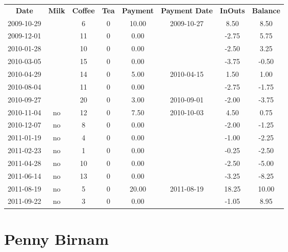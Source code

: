 \begin{center}
\begin{tabular}{cccccccc}
\textbf{Date} & \textbf{Milk} & \textbf{Coffee} & \textbf{Tea} & \textbf{Payment} & \textbf{Payment Date} & \textbf{InOuts} & \textbf{Balance} \\
2009-10-29 &  &  6 & 0 & 10.00 & 2009-10-27 &  8.50 &  8.50\\ 
2009-12-01 &  & 11 & 0 &  0.00 &  & -2.75 &  5.75\\ 
2010-01-28 &  & 10 & 0 &  0.00 &  & -2.50 &  3.25\\ 
2010-03-05 &  & 15 & 0 &  0.00 &  & -3.75 & -0.50\\ 
2010-04-29 &  & 14 & 0 &  5.00 & 2010-04-15 &  1.50 &  1.00\\ 
2010-08-04 &  & 11 & 0 &  0.00 &  & -2.75 & -1.75\\ 
2010-09-27 &  & 20 & 0 &  3.00 & 2010-09-01 & -2.00 & -3.75\\ 
2010-11-04 & no & 12 & 0 &  7.50 & 2010-10-03 &  4.50 &  0.75\\ 
2010-12-07 & no &  8 & 0 &  0.00 &  & -2.00 & -1.25\\ 
2011-01-19 & no &  4 & 0 &  0.00 &  & -1.00 & -2.25\\ 
2011-02-23 & no &  1 & 0 &  0.00 &  & -0.25 & -2.50\\ 
2011-04-28 & no & 10 & 0 &  0.00 &  & -2.50 & -5.00\\ 
2011-06-14 & no & 13 & 0 &  0.00 &  & -3.25 & -8.25\\ 
2011-08-19 & no &  5 & 0 & 20.00 & 2011-08-19 & 18.25 & 10.00\\ 
2011-09-22 & no &  3 & 0 &  0.00 &  & -1.05 &  8.95
\end{tabular}
\end{center}

\section{Penny Birnam}


